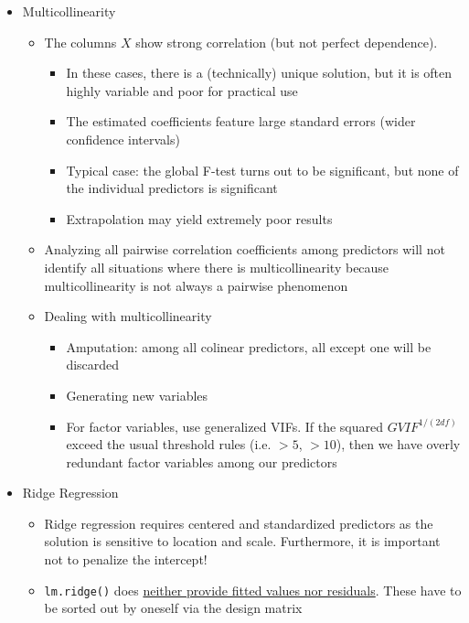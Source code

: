 \documentclass[a4paper]{article}
\begin{document}
\begin{itemize}
\begin{itemize}
\begin{itemize}
        \end{itemize}
    \end{itemize}
    \item Multicollinearity
    \begin{itemize}
        \item The columns $X$ show strong correlation (but not perfect dependence).
        \begin{itemize}
            \item In these cases, there is a (technically) unique solution, but it is often highly variable and poor for practical use
            \item The estimated coefficients feature large standard errors (wider confidence intervals)
            \item Typical case: the global F-test turns out to be significant, but none of the individual predictors is significant
            \item Extrapolation may yield extremely poor results
        \end{itemize}
        \item Analyzing all pairwise correlation coefficients among predictors will not identify all situations where there is multicollinearity because multicollinearity is not always a pairwise phenomenon
        \item Dealing with multicollinearity
        \begin{itemize}
            \item Amputation: among all colinear predictors, all except one will be discarded
            \item Generating new variables
            \item For factor variables, use generalized VIFs. If the squared $GVIF^{1/(2df)}$ exceed the usual threshold rules (i.e. $>5$, $>10$), then we have overly redundant factor variables among our predictors
        \end{itemize}
    \end{itemize}
    \item Ridge Regression
    \begin{itemize}
        \item Ridge regression requires centered and standardized predictors as the solution is sensitive to location and scale. Furthermore, it is important not to penalize the intercept!
        \item \texttt{lm.ridge()} does \underline{neither provide fitted values nor residuals}. These have to be sorted out by oneself via the design matrix

\end{itemize}
\end{itemize}
\end{document}
